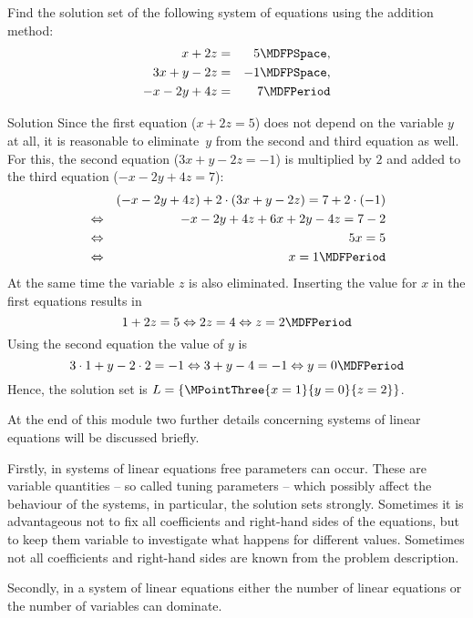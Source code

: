 \begin{MExercises}
\begin{MExercise}
Find the solution set of the following system of equations using the addition method:
\begin{eqnarray*}
x + 2 z & = & 5 \MDFPSpace, \\ 3 x + y - 2 z & = & - 1  \MDFPSpace,\\ - x - 2 y + 4 z & = & 7 \MDFPeriod
\end{eqnarray*}

\begin{MHint}{Solution}
Since the first equation ($x + 2 z = 5$) does not depend on the variable $y$ at all, it is reasonable
to eliminate~$y$ from the second and third equation as well. For this, the second equation
($3 x + y - 2 z = - 1$) is multiplied by $2$ and added to the third equation ($- x - 2 y + 4 z = 7$):
\begin{eqnarray*}
& & (- x - 2 y + 4 z) + 2 \cdot (3 x + y - 2 z) = 7 + 2 \cdot (- 1) \\
& \Leftrightarrow & - x - 2 y + 4 z + 6 x + 2 y - 4 z = 7 - 2 \\
& \Leftrightarrow & 5 x = 5 \\
& \Leftrightarrow & x = 1 \MDFPeriod
\end{eqnarray*}
At the same time the variable $z$ is also eliminated. Inserting
the value for $x$ in the first equations results in
$$1 + 2 z = 5 \Leftrightarrow 2 z = 4 \Leftrightarrow z = 2 \MDFPeriod$$
Using the second equation the value of $y$ is
$$3 \cdot 1 + y - 2 \cdot 2 = - 1 \Leftrightarrow 3 + y - 4 = - 1 \Leftrightarrow y = 0 \MDFPeriod$$
Hence, the solution set is ${\ML} = \{ \MPointThree{x = 1}{y = 0}{z = 2} \}$.
\end{MHint}
\end{MExercise}
\end{MExercises}




\begin{MIntro}

At the end of this module two further details concerning systems of linear equations
will be discussed briefly.

Firstly, in systems of linear equations free parameters can occur. These are variable 
quantities -- so called tuning parameters -- which possibly affect the behaviour of the systems, in
particular, the solution sets strongly. Sometimes it is advantageous not to fix all coefficients
and right-hand sides of the equations, but to keep them variable to investigate what happens for 
different values. Sometimes not all coefficients and right-hand sides are known from the 
problem description. 

Secondly, in a system of linear equations either the number of linear equations or the number of 
variables can dominate.

\end{MIntro}

